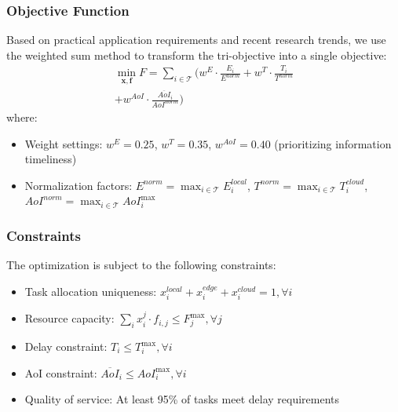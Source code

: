 \documentclass[conference]{IEEEtran}
\begin{document}
\subsubsection{Objective Function}
Based on practical application requirements and recent research trends, we use the weighted sum method to transform the tri-objective into a single objective:
\begin{equation}
    \begin{split}
        \min_{\mathbf{x}, \mathbf{f}} F = \sum_{i \in \mathcal{T}} \bigg( w^E \cdot \frac{E_i}{E^{norm}} + w^T \cdot \frac{T_i}{T^{norm}}
        \\+ w^{AoI} \cdot \frac{\overline{AoI}_i}{AoI^{norm}} \bigg)
    \end{split}
\end{equation}
where:
\begin{itemize}
    \item Weight settings: $w^E = 0.25$, $w^T = 0.35$, $w^{AoI} = 0.40$ (prioritizing information timeliness)
    \item Normalization factors: $E^{norm} = \max_{i \in \mathcal{T}} E_i^{local}$, $T^{norm} = \max_{i \in \mathcal{T}} T_i^{cloud}$, $AoI^{norm} = \max_{i \in \mathcal{T}} AoI_i^{\max}$
\end{itemize}

\subsubsection{Constraints}
The optimization is subject to the following constraints:
\begin{itemize}
    \item Task allocation uniqueness: $x_{i}^{local} + x_{i}^{edge} + x_{i}^{cloud} = 1, \forall i$
    \item Resource capacity: $\sum_{i} x_{i}^{j} \cdot f_{i,j} \leq F_{j}^{\max}, \forall j$
    \item Delay constraint: $T_i \leq T_i^{\max}, \forall i$
    \item AoI constraint: $\overline{AoI}_i \leq AoI_i^{\max}, \forall i$
    \item Quality of service: At least 95\% of tasks meet delay requirements
\end{itemize}
\end{document}
